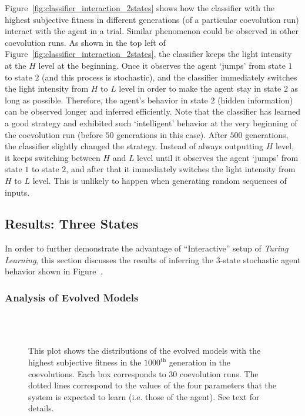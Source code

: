 Figure~\ref{fig:classifier_interaction_2states} shows how the classifier with the highest subjective fitness in different generations (of a particular coevolution run) interact with the agent in a trial. Similar phenomenon could be observed in other coevolution runs. As shown in the top left of Figure~\ref{fig:classifier_interaction_2states}, the classifier keeps the light intensity at the $H$ level at the beginning. Once it observes the agent `jumps' from state $1$ to state $2$ (and this process is stochastic), and the classifier immediately switches the light intensity from $H$ to $L$ level in order to make the agent stay in state $2$ as long as possible. Therefore, the agent's behavior in state $2$ (hidden information) can be observed longer and inferred efficiently. Note that the classifier has learned a good strategy and exhibited such `intelligent' behavior at the very beginning of the coevolution run (before $50$ generations in this case). After $500$ generations, the classifier slightly changed the strategy. Instead of always outputting $H$ level, it keeps switching between $H$ and $L$ level until it observes the agent `jumps' from state $1$ to state $2$, and after that it immediately switches the light intensity from $H$ to $L$ level. This is unlikely to happen when generating random sequences of inputs.

\subsection{Results: Three States}\label{sec:results_interaction_stochastic_3states}

In order to further demonstrate the advantage of ``Interactive'' setup of \textit{Turing Learning}, this section discusses the results of inferring the 3-state stochastic agent behavior shown in Figure~. 

\subsubsection{Analysis of Evolved Models}
\begin{figure}[!t]%
	\centering
		\\
		\\
		\caption{This plot shows the distributions of the evolved models with the highest subjective fitness in the $1000^\textrm{th}$ generation in the coevolutions. Each box corresponds to $30$ coevolution runs. The dotted lines correspond to the values of the four parameters that the system is expected to learn (i.e. those of the agent). See text for details.\label{fig:parameters_box_stochastic_three_states}}
\end{figure}

